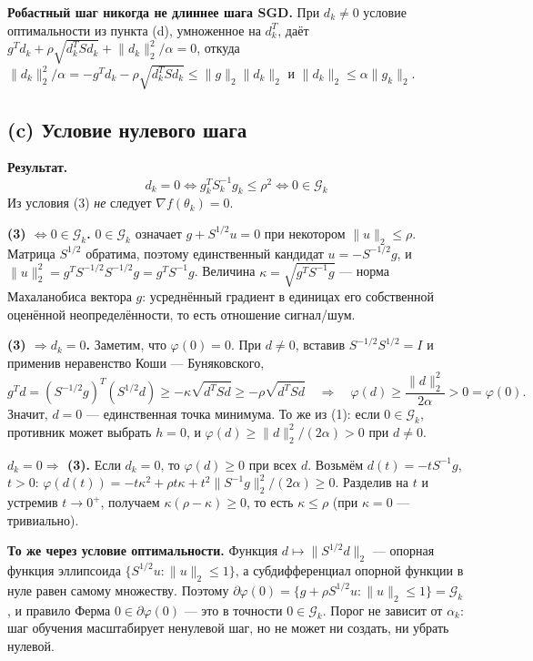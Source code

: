 \documentclass[11pt,a4paper]{article}
\newcommand{\G}{\mathcal{G}_k}
\newcommand{\norm}[1]{\lVert #1\rVert_2}
\begin{document}
\textbf{Робастный шаг никогда не длиннее шага SGD.} При $d_k\ne0$ условие оптимальности из
пункта (d), умноженное на $d_k^T$, даёт $g^Td_k+\rho\sqrt{d_k^TSd_k}+\norm{d_k}^2/\alpha=0$,
откуда $\norm{d_k}^2/\alpha=-g^Td_k-\rho\sqrt{d_k^TSd_k}\le\norm g\norm{d_k}$ и
$\norm{d_k}\le\alpha\norm{g_k}$.

\subsection{(c) Условие нулевого шага}

\textbf{Результат.}
\begin{equation*}
\boxed{\;d_k=0\iff g_k^TS_k^{-1}g_k\le\rho^2\iff0\in\G\;}
\end{equation*}
Из условия (3) \emph{не} следует $\nabla f(\theta_k)=0$.

\textbf{(3) $\iff0\in\G$.} $0\in\G$ означает $g+S^{1/2}u=0$ при некотором $\norm u\le\rho$.
Матрица $S^{1/2}$ обратима, поэтому единственный кандидат $u=-S^{-1/2}g$, и
$\norm u^2=g^TS^{-1/2}S^{-1/2}g=g^TS^{-1}g$. Величина $\kappa=\sqrt{g^TS^{-1}g}$ — норма
Махаланобиса вектора $g$: усреднённый градиент в единицах его собственной оценённой
неопределённости, то есть отношение сигнал/шум.

\textbf{(3) $\Rightarrow d_k=0$.} Заметим, что $\varphi(0)=0$. При $d\ne0$, вставив
$S^{-1/2}S^{1/2}=I$ и применив неравенство Коши — Буняковского,
\begin{equation*}
g^Td=(S^{-1/2}g)^T(S^{1/2}d)\ge-\kappa\sqrt{d^TSd}\ge-\rho\sqrt{d^TSd}
\quad\Longrightarrow\quad
\varphi(d)\ge\frac{\norm d^2}{2\alpha}>0=\varphi(0).
\end{equation*}
Значит, $d=0$ — единственная точка минимума. То же из (1): если $0\in\G$, противник может выбрать
$h=0$, и $\varphi(d)\ge\norm d^2/(2\alpha)>0$ при $d\ne0$.

\textbf{$d_k=0\Rightarrow$ (3).} Если $d_k=0$, то $\varphi(d)\ge0$ при всех $d$. Возьмём
$d(t)=-tS^{-1}g$, $t>0$: $\varphi(d(t))=-t\kappa^2+\rho t\kappa+t^2\norm{S^{-1}g}^2/(2\alpha)\ge0$.
Разделив на $t$ и устремив $t\to0^+$, получаем $\kappa(\rho-\kappa)\ge0$, то есть $\kappa\le\rho$
(при $\kappa=0$ — тривиально).

\textbf{То же через условие оптимальности.} Функция $d\mapsto\norm{S^{1/2}d}$ — опорная функция
эллипсоида $\{S^{1/2}u:\norm u\le1\}$, а субдифференциал опорной функции в нуле равен самому
множеству. Поэтому $\partial\varphi(0)=\{g+\rho S^{1/2}u:\norm u\le1\}=\G$, и правило Ферма
$0\in\partial\varphi(0)$ — это в точности $0\in\G$. Порог не зависит от $\alpha_k$: шаг обучения
масштабирует ненулевой шаг, но не может ни создать, ни убрать нулевой.
\end{document}
